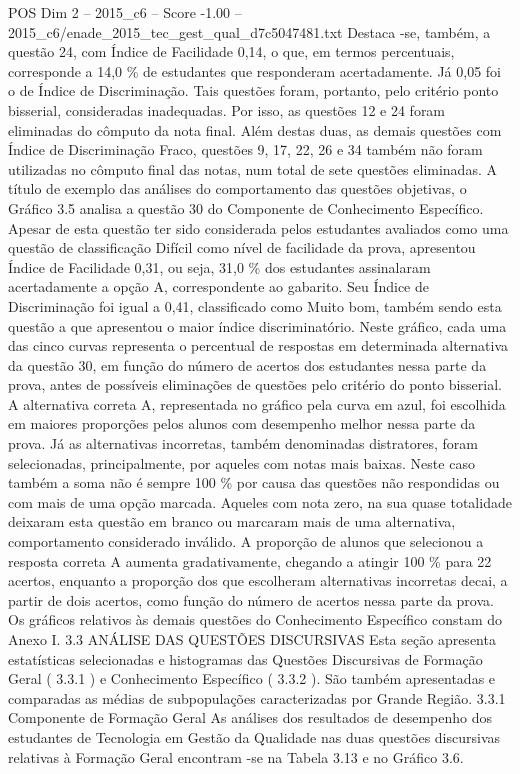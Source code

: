 \begin{textsample}{POS Dim 2 – 2015\_c6 – Score -1.00 – 2015\_c6/enade\_2015\_tec\_gest\_qual\_d7c5047481.txt}
Destaca -se, também, a questão 24, com Índice de Facilidade 0,14, o que, em termos percentuais, corresponde a 14,0 \% de estudantes que responderam acertadamente.
Já 0,05 foi o de Índice de Discriminação.
Tais questões foram, portanto, pelo critério ponto bisserial, consideradas inadequadas.
Por isso, as questões 12 e 24 foram eliminadas do cômputo da nota final.
Além destas duas, as demais questões com Índice de Discriminação Fraco, questões 9, 17, 22, 26 e 34 também não foram utilizadas no cômputo final das notas, num total de sete questões eliminadas.
A título de exemplo das análises do comportamento das questões objetivas, o Gráfico 3.5 analisa a questão 30 do Componente de Conhecimento Específico.
Apesar de esta questão ter sido considerada pelos estudantes avaliados como uma questão de classificação Difícil como nível de facilidade da prova, apresentou Índice de Facilidade 0,31, ou seja, 31,0 \% dos estudantes assinalaram acertadamente a opção A, correspondente ao gabarito.
Seu Índice de Discriminação foi igual a 0,41, classificado como Muito bom, também sendo esta questão a que apresentou o maior índice discriminatório.
Neste gráfico, cada uma das cinco curvas representa o percentual de respostas em determinada alternativa da questão 30, em função do número de acertos dos estudantes nessa parte da prova, antes de possíveis eliminações de questões pelo critério do ponto bisserial.
A alternativa correta A, representada no gráfico pela curva em azul, foi escolhida em maiores proporções pelos alunos com desempenho melhor nessa parte da prova.
Já as alternativas incorretas, também denominadas distratores, foram selecionadas, principalmente, por aqueles com notas mais baixas.
Neste caso também a soma não é sempre 100 \% por causa das questões não respondidas ou com mais de uma opção marcada.
Aqueles com nota zero, na sua quase totalidade deixaram esta questão em branco ou marcaram mais de uma alternativa, comportamento considerado inválido.
A proporção de alunos que selecionou a resposta correta A aumenta gradativamente, chegando a atingir 100 \% para 22 acertos, enquanto a proporção dos que escolheram alternativas incorretas decai, a partir de dois acertos, como função do número de acertos nessa parte da prova.
Os gráficos relativos às demais questões do Conhecimento Específico constam do Anexo I. 3.3 ANÁLISE DAS QUESTÕES DISCURSIVAS Esta seção apresenta estatísticas selecionadas e histogramas das Questões Discursivas de Formação Geral ( 3.3.1 ) e Conhecimento Específico ( 3.3.2 ).
São também apresentadas e comparadas as médias de subpopulações caracterizadas por Grande Região. 3.3.1 Componente de Formação Geral As análises dos resultados de desempenho dos estudantes de Tecnologia em Gestão da Qualidade nas duas questões discursivas relativas à Formação Geral encontram -se na Tabela 3.13 e no Gráfico 3.6.

\end{textsample}
